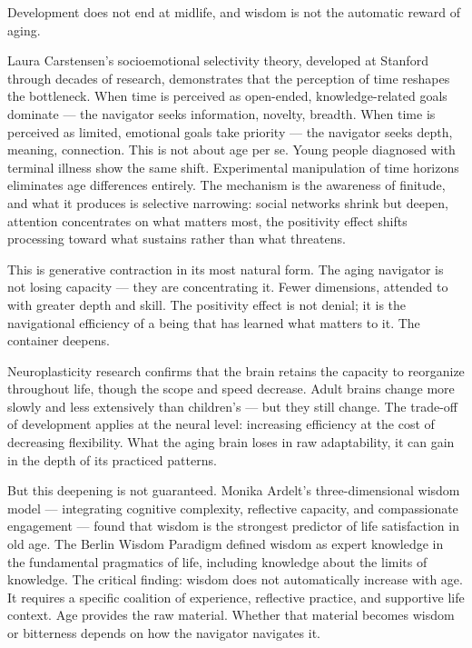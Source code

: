 Development does not end at midlife, and wisdom is not the automatic reward of aging.


Laura Carstensen's socioemotional selectivity theory, developed at Stanford through decades of research, demonstrates that the perception of time reshapes the bottleneck. When time is perceived as open-ended, knowledge-related goals dominate — the navigator seeks information, novelty, breadth. When time is perceived as limited, emotional goals take priority — the navigator seeks depth, meaning, connection. This is not about age per se. Young people diagnosed with terminal illness show the same shift. Experimental manipulation of time horizons eliminates age differences entirely. The mechanism is the awareness of finitude, and what it produces is selective narrowing: social networks shrink but deepen, attention concentrates on what matters most, the positivity effect shifts processing toward what sustains rather than what threatens.


This is generative contraction in its most natural form. The aging navigator is not losing capacity — they are concentrating it. Fewer dimensions, attended to with greater depth and skill. The positivity effect is not denial; it is the navigational efficiency of a being that has learned what matters to it. The container deepens.


Neuroplasticity research confirms that the brain retains the capacity to reorganize throughout life, though the scope and speed decrease. Adult brains change more slowly and less extensively than children's — but they still change. The trade-off of development applies at the neural level: increasing efficiency at the cost of decreasing flexibility. What the aging brain loses in raw adaptability, it can gain in the depth of its practiced patterns.


But this deepening is not guaranteed. Monika Ardelt's three-dimensional wisdom model — integrating cognitive complexity, reflective capacity, and compassionate engagement — found that wisdom is the strongest predictor of life satisfaction in old age. The Berlin Wisdom Paradigm defined wisdom as expert knowledge in the fundamental pragmatics of life, including knowledge about the limits of knowledge. The critical finding: wisdom does not automatically increase with age. It requires a specific coalition of experience, reflective practice, and supportive life context. Age provides the raw material. Whether that material becomes wisdom or bitterness depends on how the navigator navigates it.


